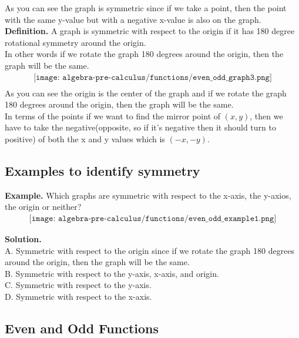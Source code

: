 As you can see the graph is symmetric since if we take a point, then the point with the same y-value but with a negative x-value is also on the graph. \\
\textbf{Definition.} A graph is symmetric with respect to the origin if it has 180 degree rotational symmetry around the origin. \\
In other words if we rotate the graph 180 degrees around the origin, then the graph will be the same. \\

\begin{align*}
	\texttt{[image: algebra-pre-calculus/functions/even\_odd\_graph3.png]} \\
\end{align*}
As you can see the origin is the center of the graph and if we rotate the graph 180 degrees around the origin, then the graph will be the same. \\
In terms of the points if we want to find the mirror point of $(x,y)$, then we have to take the negative(opposite, so if it's negative then it should turn to positive) of both the x and y values which is $(-x,-y)$. \\

\subsection{Examples to identify symmetry}

\textbf{Example.} Which graphs are symmetric with respect to the x-axis, the y-axios, the origin or neither? \\

\begin{align*}
\texttt{[image: algebra-pre-calculus/functions/even\_odd\_example1.png]}
\end{align*}

\textbf{Solution.} \\
A. Symmetric with respect to the origin since if we rotate the graph 180 degrees around the origin, then the graph will be the same. \\
B. Symmetric with respect to the y-axis, x-axis, and origin. \\
C. Symmetric with respect to the y-axis. \\
D. Symmetric with respect to the x-axis. \\


\subsection{Even and Odd Functions}

